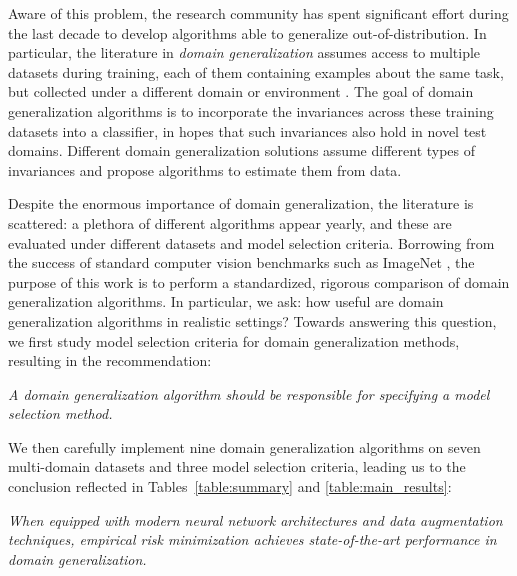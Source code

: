 \documentclass{article}
\begin{document}
Aware of this problem, the research community has spent significant effort during the last decade to develop algorithms able to generalize out-of-distribution.
%
In particular, the literature in \emph{domain generalization} assumes access to multiple datasets during training, each of them containing examples about the same task, but collected under a different domain or environment \citep{blanchard2011generalizing, muandet2013domain}. 
%
The goal of domain generalization algorithms is to incorporate the invariances across these training datasets into a classifier, in hopes that such invariances also hold in novel test domains.
%
Different domain generalization solutions assume different types of invariances and propose algorithms to estimate them from data.

Despite the enormous importance of domain generalization, the literature is scattered: a plethora of different algorithms appear yearly, and these are evaluated under different datasets and model selection criteria.
%
Borrowing from the success of standard computer vision benchmarks such as ImageNet \citep{russakovsky2015ImageNet}, the purpose of this work is to perform a standardized, rigorous comparison of domain generalization algorithms.
%
In particular, we ask: how useful are domain generalization algorithms in realistic settings?
%
Towards answering this question, we first study model selection criteria for domain generalization methods, resulting in the recommendation: 
\begin{center}
    \textit{A domain generalization algorithm should be responsible for specifying a model selection method.}
\end{center}
%
We then carefully implement nine domain generalization algorithms on seven multi-domain datasets and three model selection criteria, leading us to the conclusion reflected in Tables~\ref{table:summary} and \ref{table:main_results}:
\begin{center}
    \textit{When equipped with modern neural network architectures and data augmentation techniques, empirical risk minimization achieves state-of-the-art performance in domain generalization.}
\end{center}
%
\end{document}
